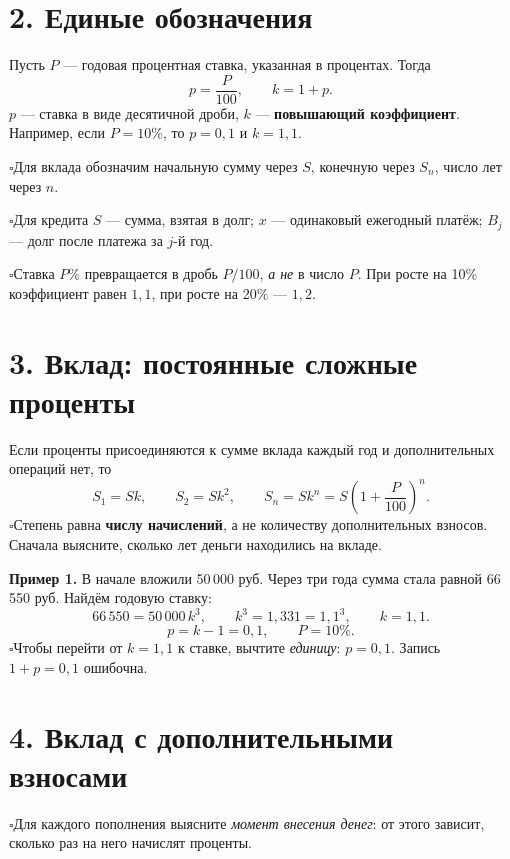 \documentclass[a4paper,12pt]{article}
\newcommand{\checkitem}[1]{\noindent\(\square\)\enspace #1\par}
\newcommand{\keyterm}[1]{{\color{darkaccent}\textbf{#1}}}
\newcommand{\smallrule}{\par\smallskip\noindent{\color{lightline}\rule{\linewidth}{.4pt}}\par\smallskip}
\begin{document}
\section*{2. Единые обозначения}
Пусть \(P\) --- годовая процентная ставка, указанная в процентах. Тогда
\[
\boxed{p=\frac{P}{100}},\qquad
\boxed{k=1+p}.
\]
\(p\) --- ставка в виде десятичной дроби, \(k\) --- \keyterm{повышающий коэффициент}. Например, если \(P=10\%\), то \(p=0{,}1\) и \(k=1{,}1\).

\checkitem{Для вклада обозначим начальную сумму через \(S\), конечную через \(S_n\), число лет через \(n\).}
\checkitem{Для кредита \(S\) --- сумма, взятая в долг; \(x\) --- одинаковый ежегодный платёж; \(B_j\) --- долг после платежа за \(j\)-й год.}
\checkitem{Ставка \(P\%\) превращается в дробь \(P/100\), \emph{а не} в число \(P\). При росте на 10\% коэффициент равен \(1{,}1\), при росте на 20\% --- \(1{,}2\).}
\smallrule
\section*{3. Вклад: постоянные сложные проценты}
Если проценты присоединяются к сумме вклада каждый год и дополнительных операций нет, то
\[
S_1=Sk,\qquad S_2=Sk^2,\qquad
\boxed{S_n=Sk^n=S\left(1+\frac{P}{100}\right)^n}.
\]
\checkitem{Степень равна \keyterm{числу начислений}, а не количеству дополнительных взносов. Сначала выясните, сколько лет деньги находились на вкладе.}
\textbf{Пример 1.} В начале вложили 50\,000 руб. Через три года сумма стала равной 66\,550 руб. Найдём годовую ставку:
\[
66\,550=50\,000\,k^3,\qquad
k^3=1{,}331=1{,}1^3,\qquad
k=1{,}1.
\]
\[
\boxed{p=k-1=0{,}1,\qquad P=10\%.}
\]
\checkitem{Чтобы перейти от \(k=1{,}1\) к ставке, вычтите \emph{единицу}: \(p=0{,}1\). Запись \(1+p=0{,}1\) ошибочна.}

\section*{4. Вклад с дополнительными взносами}
\checkitem{Для каждого пополнения выясните \emph{момент внесения денег}: от этого зависит, сколько раз на него начислят проценты.}
\end{document}

